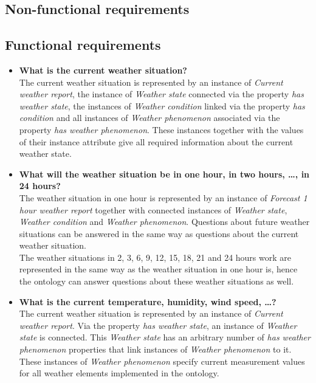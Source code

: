 \subsection{Non-functional requirements}
\label{sec:evaluation_non_functional}


\subsection{Functional requirements}
\label{sec:evaluation_functional}

\begin{itemize}
  \item \textbf{What is the current weather situation?}\\
    The current weather situation is represented by an instance of \emph{Current weather report}, the instance of \emph{Weather state} connected via the property \emph{has weather state}, the instances of \emph{Weather condition} linked via the property \emph{has condition} and all instances of \emph{Weather phenomenon} associated via the property \emph{has weather phenomenon}. These instances together with the values of their instance attribute give all required information about the current weather state.
  \item \textbf{What will the weather situation be in one hour, in two hours, …, in 24 hours?}\\
    The weather situation in one hour is represented by an instance of \emph{Forecast 1 hour weather report} together with connected instances of \emph{Weather state}, \emph{Weather condition} and \emph{Weather phenomenon}. Questions about future weather situations can be answered in the same way as questions about the current weather situation.\\
    The weather situations in 2, 3, 6, 9, 12, 15, 18, 21 and 24 hours work are represented in the same way as the weather situation in one hour is, hence the ontology can answer questions about these weather situations as well.
  \item \textbf{What is the current temperature, humidity, wind speed, …?}\\
    The current weather situation is represented by an instance of \emph{Current weather report}. Via the property \emph{has weather state}, an instance of \emph{Weather state} is connected. This \emph{Weather state} has an arbitrary number of \emph{has weather phenomenon} properties that link instances of \emph{Weather phenomenon} to it. These instances of \emph{Weather phenomenon} specify current measurement values for all weather elements implemented in the ontology.\\

\end{itemize}
